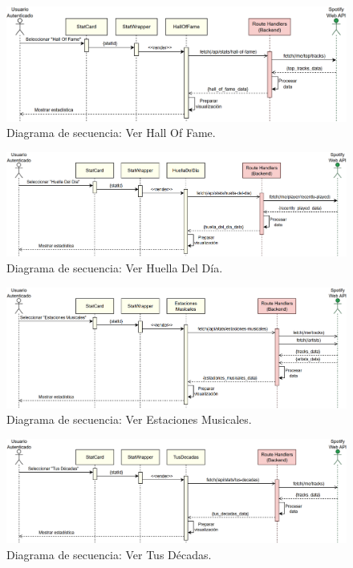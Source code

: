 \begin{figure}[H]
    \centering
    \includegraphics[width=\textwidth]{figures/diagramas_secuencia/ds_ver_hall_of_fame.png}
    \caption{Diagrama de secuencia: Ver Hall Of Fame.}
    \label{fig:ds_ver_hall_of_fame}
\end{figure}

\begin{figure}[H]
    \centering
    \includegraphics[width=\textwidth]{figures/diagramas_secuencia/ds_ver_huella_del_dia.png}
    \caption{Diagrama de secuencia: Ver Huella Del Día.}
    \label{fig:ds_ver_huella_del_dia}
\end{figure}

\begin{figure}[H]
    \centering
    \includegraphics[width=\textwidth]{figures/diagramas_secuencia/ds_ver_estaciones_musicales.png}
    \caption{Diagrama de secuencia: Ver Estaciones Musicales.}
    \label{fig:ds_ver_estaciones_musicales}
\end{figure}

\begin{figure}[H]
    \centering
    \includegraphics[width=\textwidth]{figures/diagramas_secuencia/ds_ver_tus_decadas.png}
    \caption{Diagrama de secuencia: Ver Tus Décadas.}
    \label{fig:ds_ver_tus_decadas}
\end{figure}

